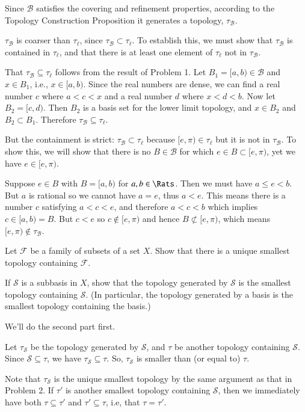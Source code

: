 \documentclass{homework}
\newcommand{\calB}{\mathcal{B}}
\newcommand{\calF}{\mathcal{F}}
\newcommand{\calS}{\mathcal{S}}
\begin{document}
Since $\calB$ satisfies the covering and refinement properties,
according to the Topology Construction Proposition it generates
a topology, $\tau_\calB$.

$\tau_\calB$ is coarser than $\tau_\ell$, since $\tau_\calB \subset \tau_\ell$.
To establish this, we must show that $\tau_\calB$ is contained in $\tau_\ell$,
and that there is at least one element of $\tau_\ell$ not in $\tau_\calB$.

That $\tau_\calB \subseteq \tau_\ell$ follows from the result of Problem 1.
Let $B_1=[a,b)\in\calB$ and $x\in B_1$, i.e., $x\in[a,b)$.  Since the real 
numbers are dense, we can find a real number $c$ where $a<c<x$ and
a real number $d$ where $x<d<b$.  Now let
$B_2=[c,d)$.  Then $B_2$ is a basis set for the lower limit topology, and
$x\in B_2$ and $B_2\subset B_1$.  Therefore
$\tau_\calB \subseteq \tau_\ell$.

But the containment is strict: $\tau_\calB \subset \tau_\ell$ because $[e,\pi)\in\tau_\ell$
but it is not in $\tau_\calB$.
To show this, we will show that there is no $B\in\calB$ for
which $e\in B\subset[e,\pi)$, yet we have $e\in[e,\pi)$.

Suppose $e\in B$ with $B=[a,b)$ for $a,b\in\Rats$.
Then we must have $a\le e<b$.
But $a$ is rational so we cannot have $a=e$, thus $a<e$.
This means there is a number $c$ satisfying $a<c<e$, and therefore
$a<c<b$ which implies $c\in[a,b)=B$.  But $c<e$ so $c\not\in[e,\pi)$
and hence $B\not\subset [e,\pi)$, which means
$[e,\pi)\not\in\tau_\calB$.

\hrulefill
\begin{exercise}{4}
Let $\calF$ be a family of subsets of a set $X$.  Show that there is
a unique smallest topology containing $\calF$.

If $\calS$ is a subbasis in $X$, show that the topology generated by
$\calS$ is the smallest topology containing $\calS$. (In particular,
the topology generated by a basis is the smallest topology containing
the basis.)
\end{exercise}
\solution
We'll do the second part first.

Let $\tau_\calS$ be the topology generated by $\calS$, and $\tau$ be another
topology containing $\calS$.  Since $\calS\subseteq\tau$, we have
$\tau_\calS \subseteq \tau$.  So, $\tau_\calS$ is smaller than (or
equal to) $\tau$.

Note that $\tau_\calS$ is the unique smallest topology by the same argument as
that in Problem 2.  If $\tau'$ is another smallest topology containing $\calS$,
then we immediately have both $\tau\subseteq\tau'$ and $\tau'\subseteq\tau$,
i.e, that $\tau=\tau'$.
\end{document}
